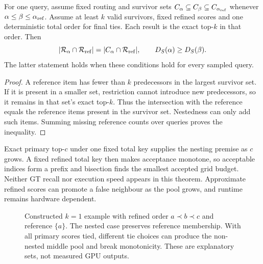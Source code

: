 \par\noindent\begin{minipage}{\linewidth}
\begin{proposition}
\label{prop:6-monotonicity}
For one query, assume fixed routing and survivor sets
$C_\alpha\subseteq C_\beta\subseteq C_{\alpha_{\rm ref}}$ whenever
$\alpha\leq\beta\leq\alpha_{\rm ref}$. Assume at least $k$ valid
survivors, fixed refined scores and one deterministic total order for
final ties. Each result is the exact top-$k$ in that order. Then
\begin{equation}
 |\mathcal R_\alpha\cap\mathcal R_{\rm ref}|
 =|C_\alpha\cap\mathcal R_{\rm ref}|,
 \qquad D_S(\alpha)\geq D_S(\beta).
 \label{eq:6-monotonicity}
\end{equation}
The latter statement holds when these conditions hold for every sampled
query.
\end{proposition}
\begin{proof}
A reference item has fewer than $k$ predecessors in the largest survivor
set. If it is present in a smaller set, restriction cannot introduce new
predecessors, so it remains in that set's exact top-$k$. Thus the
intersection with the reference equals the reference items present in
the survivor set. Nestedness can only add such items. Summing missing
reference counts over queries proves the inequality.
\end{proof}
\end{minipage}\par\medskip

Exact primary top-$c$ under one fixed total key supplies the nesting
premise as $c$ grows. A fixed refined total key then makes acceptance
monotone, so acceptable indices form a prefix and bisection finds the
smallest accepted grid budget. Neither GT recall nor execution speed
appears in this theorem. Approximate refined scores can promote a false
neighbour as the pool grows, and runtime remains hardware dependent.

\begin{figure}[tbp]
\centering

\caption[Nested and non-nested candidate pools]{Constructed $k=1$ example with refined order $a\prec b\prec c$
and reference $\{a\}$. The nested case preserves reference membership.
With all primary scores tied, different tie choices can produce the
non-nested middle pool and break monotonicity. These are explanatory
sets, not measured GPU outputs.}
\label{fig:6-nesting}
\end{figure}

